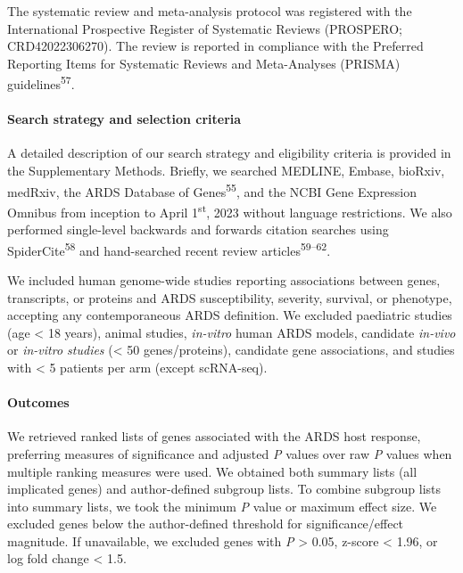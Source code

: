 \documentclass[
  11,
  a4paper,
]{article}
\let\oldparagraph\paragraph
\renewcommand{\paragraph}[1]{\oldparagraph{#1}\mbox{}}
\begin{document}
The systematic review and meta-analysis protocol was registered with the
International Prospective Register of Systematic Reviews (PROSPERO;
CRD42022306270). The review is reported in compliance with the Preferred
Reporting Items for Systematic Reviews and Meta-Analyses (PRISMA)
guidelines\textsuperscript{57}.

\hypertarget{search-strategy-and-selection-criteria}{%
\paragraph{Search strategy and selection
criteria}\label{search-strategy-and-selection-criteria}}

A detailed description of our search strategy and eligibility criteria
is provided in the Supplementary Methods. Briefly, we searched MEDLINE,
Embase, bioRxiv, medRxiv, the ARDS Database of
Genes\textsuperscript{55}, and the NCBI Gene Expression Omnibus from
inception to April 1\textsuperscript{st}, 2023 without language
restrictions. We also performed single-level backwards and forwards
citation searches using SpiderCite\textsuperscript{58} and hand-searched
recent review articles\textsuperscript{59--62}.

We included human genome-wide studies reporting associations between
genes, transcripts, or proteins and ARDS susceptibility, severity,
survival, or phenotype, accepting any contemporaneous ARDS definition.
We excluded paediatric studies (age \textless{} 18 years), animal
studies, \emph{in-vitro} human ARDS models, candidate \emph{in-vivo} or
\emph{in-vitro studies} (\textless{} 50 genes/proteins), candidate gene
associations, and studies with \textless{} 5 patients per arm (except
scRNA-seq).

\hypertarget{outcomes}{%
\paragraph{Outcomes}\label{outcomes}}

We retrieved ranked lists of genes associated with the ARDS host
response, preferring measures of significance and adjusted \emph{P}
values over raw \emph{P} values when multiple ranking measures were
used. We obtained both summary lists (all implicated genes) and
author-defined subgroup lists. To combine subgroup lists into summary
lists, we took the minimum \emph{P} value or maximum effect size. We
excluded genes below the author-defined threshold for
significance/effect magnitude. If unavailable, we excluded genes with
\emph{P} \textgreater{} 0.05, z-score \textless{} 1.96, or log fold
change \textless{} 1.5.
\end{document}
